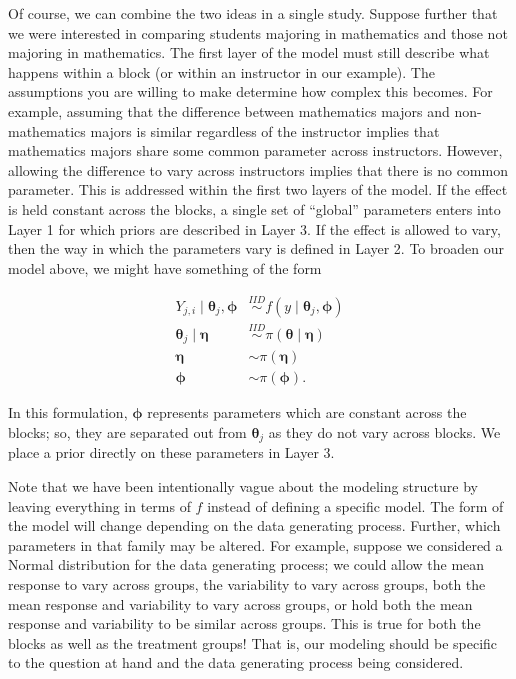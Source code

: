 \documentclass[
  letterpaper,
  DIV=11,
  numbers=noendperiod]{scrreprt}
\theoremstyle{definition}
\theoremstyle{plain}
\theoremstyle{definition}
\theoremstyle{remark}
\begin{document}
Of course, we can combine the two ideas in a single study. Suppose
further that we were interested in comparing students majoring in
mathematics and those not majoring in mathematics. The first layer of
the model must still describe what happens within a block (or within an
instructor in our example). The assumptions you are willing to make
determine how complex this becomes. For example, assuming that the
difference between mathematics majors and non-mathematics majors is
similar regardless of the instructor implies that mathematics majors
share some common parameter across instructors. However, allowing the
difference to vary across instructors implies that there is no common
parameter. This is addressed within the first two layers of the model.
If the effect is held constant across the blocks, a single set of
``global'' parameters enters into Layer 1 for which priors are described
in Layer 3. If the effect is allowed to vary, then the way in which the
parameters vary is defined in Layer 2. To broaden our model above, we
might have something of the form

\[
\begin{aligned}
  Y_{j, i} \mid \boldsymbol{\theta}_j, \boldsymbol{\phi} &\stackrel{IID}{\sim} f(y \mid \boldsymbol{\theta}_j, \boldsymbol{\phi}) \\
  \boldsymbol{\theta}_j \mid \boldsymbol{\eta} &\stackrel{IID}{\sim} \pi(\boldsymbol{\theta} \mid \boldsymbol{\eta}) \\
  \boldsymbol{\eta} &\sim \pi(\boldsymbol{\eta}) \\
  \boldsymbol{\phi} &\sim \pi(\boldsymbol{\phi}).
\end{aligned}
\]

In this formulation, \(\boldsymbol{\phi}\) represents parameters which
are constant across the blocks; so, they are separated out from
\(\boldsymbol{\theta}_j\) as they do not vary across blocks. We place a
prior directly on these parameters in Layer 3.

Note that we have been intentionally vague about the modeling structure
by leaving everything in terms of \(f\) instead of defining a specific
model. The form of the model will change depending on the data
generating process. Further, which parameters in that family may be
altered. For example, suppose we considered a Normal distribution for
the data generating process; we could allow the mean response to vary
across groups, the variability to vary across groups, both the mean
response and variability to vary across groups, or hold both the mean
response and variability to be similar across groups. This is true for
both the blocks as well as the treatment groups! That is, our modeling
should be specific to the question at hand and the data generating
process being considered.
\end{document}
